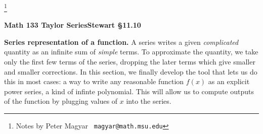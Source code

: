\documentclass[11pt]{article}
\begin{document}
\footnote[0]{Notes by Peter Magyar \ {\tt magyar@math.msu.edu}}
\vspace{-1em}

\centerline{\bf Math 133\hspace{1.5em} \hfill{\Large\bf
 Taylor Series}\hfill Stewart \S11.10}
\vspace{1em}

\noindent 
{\bf Series representation of a function.} A series writes a given {\it complicated} quantity as an infinite sum of {\it simple} terms.
To approximate the quantity, we take only the first few terms of the series,
dropping the later terms which give smaller and smaller corrections. 
In this section, we finally develop the tool that lets us do this in most cases: a way to write any reasonable function $f(x)$ as an explicit power series, a kind of infinte polynomial. 
This will allow us to compute outputs of the function 
by plugging values of $x$ into the series.
\end{document}
